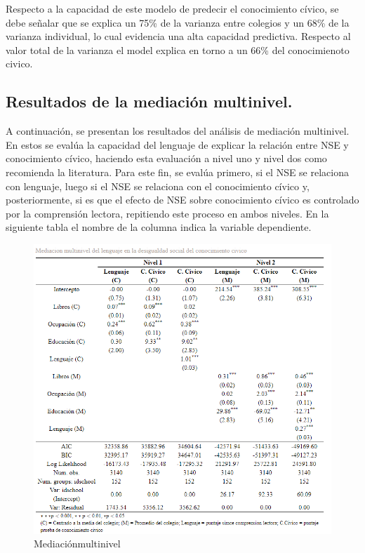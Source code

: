 \documentclass[12pt,twoside]{templates/facsothesis}
\begin{document}
Respecto a la capacidad de este modelo de predecir el conocimiento cívico, se debe señalar que se explica un 75\% de la varianza entre colegios y un 68\% de la varianza individual, lo cual evidencia una alta capacidad predictiva. Respecto al valor total de la varianza el model explica en torno a un 66\% del conocimienoto civico.

\hypertarget{resultados-de-la-mediaciuxf3n-multinivel.}{%
\subsection{Resultados de la mediación multinivel.}\label{resultados-de-la-mediaciuxf3n-multinivel.}}

A continuación, se presentan los resultados del análisis de mediación multinivel. En estos se evalúa la capacidad del lenguaje de explicar la relación entre NSE y conocimiento cívico, haciendo esta evaluación a nivel uno y nivel dos como recomienda la literatura. Para este fin, se evalúa primero, si el NSE se relaciona con lenguaje, luego si el NSE se relaciona con el conocimiento cívico y, posteriormente, si es que el efecto de NSE sobre conocimiento cívico es controlado por la comprensión lectora, repitiendo este proceso en ambos niveles. En la siguiente tabla el nombre de la columna indica la variable dependiente.

\begin{figure}

{\centering \includegraphics[width=0.8\linewidth]{images/Mediacion_n1n2} 

}

\caption{Mediaciónmultinivel}\label{fig:unnamed-chunk-14}
\end{figure}
\end{document}
